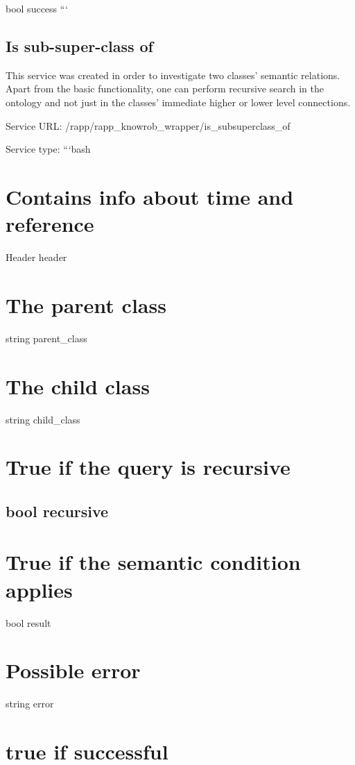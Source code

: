 bool success ```

\subsection*{Is sub-\/super-\/class of}

This service was created in order to investigate two classes’ semantic relations. Apart from the basic functionality, one can perform recursive search in the ontology and not just in the classes’ immediate higher or lower level connections.

Service U\-R\-L\-: {\ttfamily /rapp/rapp\-\_\-knowrob\-\_\-wrapper/is\-\_\-subsuperclass\-\_\-of}

Service type\-: ```bash \section*{Contains info about time and reference}

Header header \section*{The parent class}

string parent\-\_\-class \section*{The child class}

string child\-\_\-class \section*{True if the query is recursive}

\subsection*{bool recursive }

\section*{True if the semantic condition applies}

bool result \section*{Possible error}

string error \section*{true if successful}


